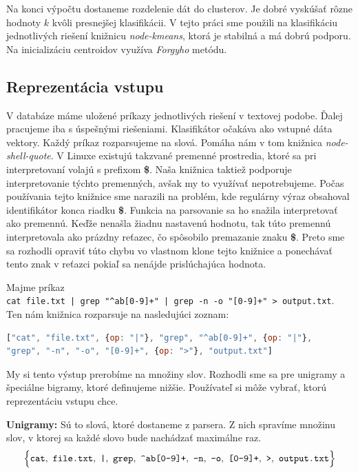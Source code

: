 Na konci výpočtu dostaneme rozdelenie dát do clusterov. Je dobré vyskúšať rôzne hodnoty
$k$ kvôli presnejšej klasifikácii.
V tejto práci sme použili na klasifikáciu jednotlivých riešení
knižnicu \textit{node-kmeans}, ktorá je stabilná a má dobrú podporu. Na inicializáciu
centroidov využíva \textit{Forgyho} metódu.

\subsection{Reprezentácia vstupu}
\label{sec:solutionclusterizing:inputrepresentation}

V databáze máme uložené príkazy
jednotlivých riešení v textovej podobe. Ďalej pracujeme iba s úspešnými riešeniami.
Klasifikátor očakáva ako vstupné dáta vektory. Každý príkaz rozparsujeme na slová.
Pomáha nám v tom knižnica \textit{node-shell-quote}. V Linuxe existujú takzvané
premenné prostredia, ktoré sa pri interpretovaní volajú s prefixom \textbf{\$}.
Naša knižnica taktiež podporuje interpretovanie týchto premenných, avšak my to
využívať nepotrebujeme. Počas používania tejto knižnice sme narazili na problém,
kde regulárny výraz obsahoval identifikátor konca riadku \textbf{\$}.
Funkcia na parsovanie sa ho snažila interpretovať ako premennú. Keďže nenašla žiadnu
nastavenú hodnotu, tak túto premennú interpretovala ako prázdny reťazec, čo spôsobilo
premazanie znaku \textbf{\$}. Preto sme sa rozhodli opraviť túto chybu vo vlastnom
klone tejto knižnice a ponechávať tento znak v reťazci pokiaľ sa nenájde prislúchajúca
hodnota.
\begin{prikl}
	Majme príkaz \\
	\verb'cat file.txt | grep "^ab[0-9]+" | grep -n -o "[0-9]+" > output.txt'. \\
	Ten nám knižnica rozparsuje na nasledujúci zoznam:
\begin{lstlisting}[language=JavaScript]
["cat", "file.txt", {op: "|"}, "grep", "^ab[0-9]+", {op: "|"},
"grep", "-n", "-o", "[0-9]+", {op: ">"}, "output.txt"]
\end{lstlisting}
\end{prikl}
\noindent My si tento výstup prerobíme na množiny slov. Rozhodli sme sa pre
unigramy a špeciálne bigramy, ktoré definujeme nižšie. Používateľ si môže
vybrať, ktorú reprezentáciu vstupu chce.

\noindent\textbf{Unigramy:} Sú to slová, ktoré dostaneme z parsera. Z nich spravíme
množinu slov, v ktorej sa každé slovo bude nachádzať maximálne raz.
$$\Big\{\verb'cat',~\verb'file.txt',~\verb'|',~\verb'grep',~\verb'^ab[0-9]+',~ \verb'-n',~\verb'-o',~\verb'[0-9]+',~\verb'>',~\verb'output.txt'\Big\}$$

